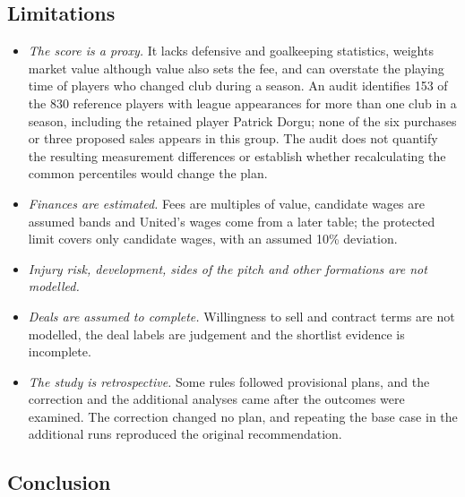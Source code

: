 \subsection{Limitations}

\begin{itemize}
\item \emph{The score is a proxy.} It lacks defensive and goalkeeping statistics, weights market value although value also sets the fee, and can overstate the playing time of players who changed club during a season. An audit identifies 153 of the 830 reference players with league appearances for more than one club in a season, including the retained player Patrick Dorgu; none of the six purchases or three proposed sales appears in this group. The audit does not quantify the resulting measurement differences or establish whether recalculating the common percentiles would change the plan.
\item \emph{Finances are estimated.} Fees are multiples of value, candidate wages are assumed bands and United's wages come from a later table; the protected limit covers only candidate wages, with an assumed 10\% deviation.
\item \emph{Injury risk, development, sides of the pitch and other formations are not modelled.}
\item \emph{Deals are assumed to complete.} Willingness to sell and contract terms are not modelled, the deal labels are judgement and the shortlist evidence is incomplete.
\item \emph{The study is retrospective.} Some rules followed provisional plans, and the correction and the additional analyses came after the outcomes were examined. The correction changed no plan, and repeating the base case in the additional runs reproduced the original recommendation.
\end{itemize}

\subsection{Conclusion}

